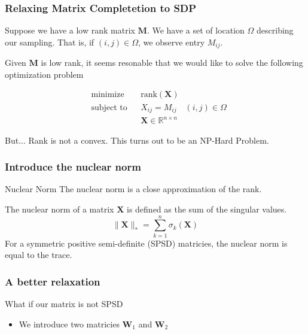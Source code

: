 \documentclass[
	11pt, %
]{beamer}
\begin{document}
\begin{frame}
	\frametitle{Relaxing Matrix Completetion to SDP}
	Suppose we have a low rank matrix $\mathbf{M}$. We have a set of location $\Omega$ describing
	our sampling. That is, if $(i,j) \in \Omega$, we observe entry $M_{ij}$. 
	
	Given $\mathbf{M}$ is low rank, 
	it seems resonable that we would like to solve the following optimization problem
	
	\pause 

	\begin{equation*}
	  \begin{aligned}
	  & {\text{minimize}}
	  & & \text{rank}(\mathbf{X}) \\[1pt]
	  & \text{subject to}
	  & & X_{ij} = M_{ij} \quad (i,j) \in \Omega\\[1pt]
	  &&& \mathbf{X} \in \mathbb{R}^{n \times n}
	  \end{aligned}
	\end{equation*}

	\pause

	\begin{alertblock}{But...}
		Rank is not a convex. This turns out to be an NP-Hard Problem.
	\end{alertblock}
\end{frame}

\begin{frame}
	\frametitle{Introduce the nuclear norm}
	\vspace{-4em}
	\begin{block}{Nuclear Norm}
		The nuclear norm is a close approximation of the rank.
	\end{block}
	\vspace{2em}
	
	The nuclear norm of a matrix $\mathbf{X}$ is defined as the sum of 
	the singular values.
	\[
	\lVert \mathbf{X} \rVert_* = \sum_{k=1}^n \sigma_k ({\mathbf{X}})  
	\]
	\pause
	For a symmetric positive semi-definite (SPSD) matricies, the nuclear norm is equal to the trace. 
\end{frame}


\begin{frame}
	\frametitle{A better relaxation}
	What if our matrix is not SPSD
	\begin{itemize}
		\item We introduce two matricies $\mathbf{W}_1$ and $\mathbf{W}_2$ 
	\end{itemize}
\end{frame}
\end{document}
